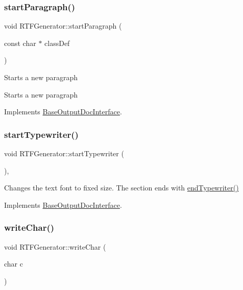 \subsubsection{\texorpdfstring{startParagraph()}{startParagraph()}}
{\footnotesize\ttfamily void R\+T\+F\+Generator\+::start\+Paragraph (\begin{DoxyParamCaption}\item[{const char $\ast$}]{class\+Def }\end{DoxyParamCaption})\hspace{0.3cm}{\ttfamily [virtual]}}

Starts a new paragraph

Starts a new paragraph 

Implements \mbox{\hyperlink{class_base_output_doc_interface_a9f711f4ef8f48b9c7b1cae625578e7ff}{Base\+Output\+Doc\+Interface}}.

\mbox{\label{class_r_t_f_generator_ac3760aa18a5102cd8e8b0a4969f0953d}} 
\subsubsection{\texorpdfstring{startTypewriter()}{startTypewriter()}}
{\footnotesize\ttfamily void R\+T\+F\+Generator\+::start\+Typewriter (\begin{DoxyParamCaption}{ }\end{DoxyParamCaption})\hspace{0.3cm}{\ttfamily [inline]}, {\ttfamily [virtual]}}

Changes the text font to fixed size. The section ends with \mbox{\hyperlink{class_r_t_f_generator_af9e17986de22ddd0b3a4afe4449b4a2c}{end\+Typewriter()}} 

Implements \mbox{\hyperlink{class_base_output_doc_interface_abde41a60b900d35b0b198f43731c1cd0}{Base\+Output\+Doc\+Interface}}.

\mbox{\label{class_r_t_f_generator_a1d1912d4a9d95b54ee88b12b3306e3d2}} 
\subsubsection{\texorpdfstring{writeChar()}{writeChar()}}
{\footnotesize\ttfamily void R\+T\+F\+Generator\+::write\+Char (\begin{DoxyParamCaption}\item[{char}]{c }\end{DoxyParamCaption})\hspace{0.3cm}{\ttfamily [virtual]}}

